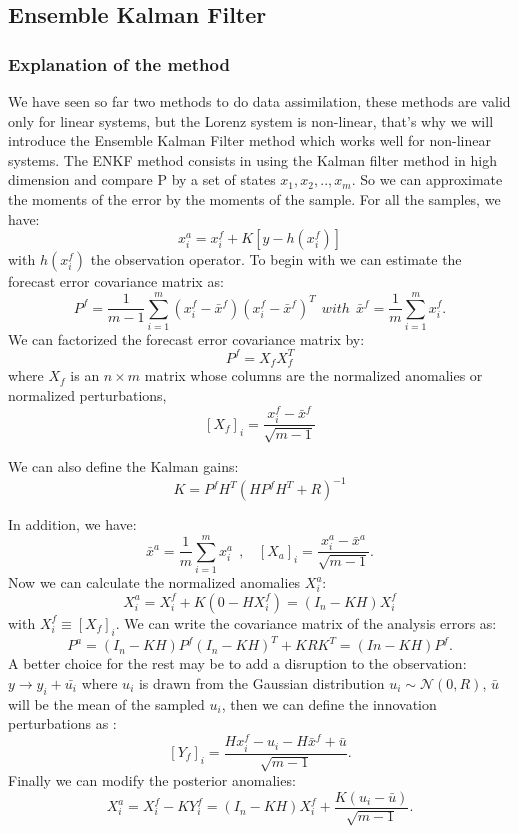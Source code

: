 \subsection{Ensemble Kalman Filter}
\subsubsection{Explanation of the method}
\noindent We have seen so far two methods to do data assimilation, these methods are valid only for linear systems, but the Lorenz system is non-linear, that's why we will introduce the Ensemble Kalman Filter method which works well for non-linear systems. The ENKF method consists in using the Kalman filter method in high dimension and compare P by a set of states $x_1,x_2,..,x_{m}$. So we can approximate the moments of the error by the moments of the sample.
For all the samples, we have:
$$x_i^a=x_i^f+K[y-h(x_i^f)]$$
with $h(x_i^f)$ the observation operator.
\newline \noindent To begin with we can estimate the
forecast error covariance matrix as:
$$P^f=\frac{1}{m-1}\sum_{i=1}^{m}(x_i^f-\bar{x}^f)(x_i^f-\bar{x}^f)^T~~with~~\bar{x}^f=\frac{1}{m}\sum_{i=1}^{m}x_i^f .$$ 
\noindent We can factorized the forecast error covariance matrix by:
$$P^f=X_f X_f^T$$
where $X_f$ is an $n \times m$ matrix whose columns are the normalized anomalies or normalized perturbations,
$$[X_f]_i=\frac{x_i^f-\bar{x}^f}{\sqrt{m-1}}$$

\noindent We can also define the Kalman gains: 
$$K=P^f H^T(HP^f H^T+R)^{-1}$$

\noindent In addition, we have:
$$
\bar{x}^a=\frac{1}{m}\sum_{i=1}^mx_i^a~~,~~~~[X_a]_i=\frac{x_i^a-\bar{x}^a}{\sqrt{m-1}}. $$
\noindent Now we can calculate the normalized anomalies $X_i^a:$
$$X_i^a=X_i^f+K(0-HX_i^f)=(I_n-KH)X_i^f$$
\noindent with $X_i^f\equiv [X_f]_i$.
\newline \noindent We can write the covariance matrix of the analysis errors as:
$$P^a=(I_n-KH)P^f(I_n-KH)^T+KRK^T=(In-KH)P^f.$$
\noindent A better choice for the rest may be to add a disruption to the observation: $y\rightarrow y_i+\bar{u_i}$ where $u_i$ is drawn from the Gaussian distribution $u_i \sim \mathcal{N}(0,R)$, $\bar{u}$ will be the mean of the sampled $u_i$, then we can define the innovation perturbations as :
$$[Y_f]_i=\frac{Hx_i^f-u_i-H\bar{x}^f+\bar{u}}{\sqrt{m-1}}.$$
\noindent Finally we can modify the posterior anomalies:
$$X_i^a=X_i^f-KY_i^f=(I_n-KH)X_i^f+\frac{K(u_i-\bar{u})}{\sqrt{m-1}}.$$
